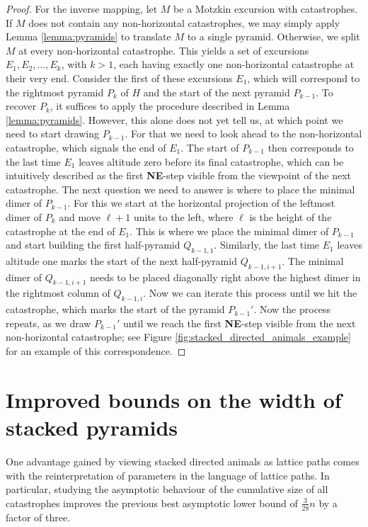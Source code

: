 \documentclass{article}
\theoremstyle{definition}
\begin{document}
\begin{proof}
For the inverse mapping, let $M$ be a Motzkin excursion with catastrophes. If $M$ does not contain any non-horizontal catastrophes, we may simply apply Lemma \ref{lemma:pyramids} to translate $M$ to a single pyramid. Otherwise, we split $M$ at every non-horizontal catastrophe. This yields a set of excursions $E_1,E_2,\dots,E_k$, with $k > 1$, each having exactly one non-horizontal catastrophe at their very end.
Consider the first of these excursions $E_1$, which will correspond to the rightmost pyramid $P_k$ of $H$ and the start of the next pyramid $P_{k-1}$. To recover $P_k$, it suffices to apply the procedure described in Lemma \ref{lemma:pyramids}.
However, this alone does not yet tell us, at which point we need to start drawing $P_{k-1}$. For that we need to look ahead to the non-horizontal catastrophe, which signals the end of $E_1$. The start of $P_{k-1}$ then corresponds to the last time $E_1$ leaves altitude zero before its final catastrophe, which can be intuitively described as the first \textbf{NE}-step visible from the viewpoint of the next catastrophe. The next question we need to answer is where to place the minimal dimer of $P_{k-1}$. 
For this we start at the horizontal projection of the leftmost dimer of $P_k$ and move $\ell + 1$ units to the left, where $\ell$ is the height of the catastrophe at the end of $E_1$. This is where we place the minimal dimer of $P_{k-1}$ and start building the first half-pyramid $Q_{k-1,1}$.
Similarly, the last time $E_1$ leaves altitude one marks the start of the next half-pyramid $Q_{k-1,i+1}$. The minimal dimer of $Q_{k-1,i+1}$ needs to be placed diagonally right above the highest dimer in the rightmost column of $Q_{k-1,i}$.
Now we can iterate this process until we hit the catastrophe, which marks the start of the pyramid $P_{k-1}'$. 
Now the process repeats, as we draw $P_{k-1}'$ until we reach the first \textbf{NE}-step visible from the next non-horizontal catastrophe; see Figure \ref{fig:stacked_directed_animals_example} for an example of this correspondence.
\end{proof}

\section{Improved bounds on the width of stacked pyramids}
\label{sec:parameters}

One advantage gained by viewing stacked directed animals as lattice paths comes with the reinterpretation of parameters in the language of lattice paths. In particular, studying the asymptotic behaviour of the cumulative size of all catastrophes improves the previous best asymptotic lower bound of $\frac{3}{28}n$ \cite[Proposition 2]{LatticeAnimals} by a factor of three.
\end{document}
